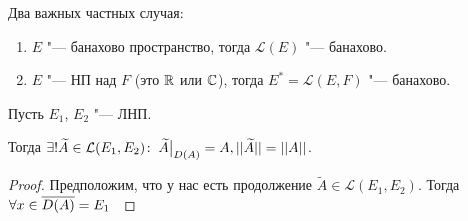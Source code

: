 \documentclass[main]{subfiles}
\begin{document}
\begin{corollary}
  Два важных частных случая:
  \begin{enumerate}
    \item \( E \) "--- банахово пространство, тогда \( \mathcal{L}(E) \) "---
      банахово.
    \item \( E \) "--- НП над \( F \) (это \( \mathbb{R} \) или \( \mathbb{C} \)),
      тогда \( E^* = \mathcal{L}(E, F) \) "--- банахово.
  \end{enumerate}
\end{corollary}

\begin{theorem}
  Пусть \( E_1 \), \( E_2 \) "--- ЛНП.

  Тогда  \( \exists! \widetilde{A} \in \mathcal{L}(E_1, E_2) \colon \:
  \widetilde{A} \bigr{|}_{D(A)} = A, ||\widetilde{A}|| = ||A|| \).
\end{theorem}
\begin{proof}
  Предположим, что у нас есть продолжение
  \( \widetilde{A} \in \mathcal{L}(E_1, E_2) \). Тогда
  \( \forall {x \in \overline{D(A)} = E_1} \; \, \)
\end{proof}
\end{document}
